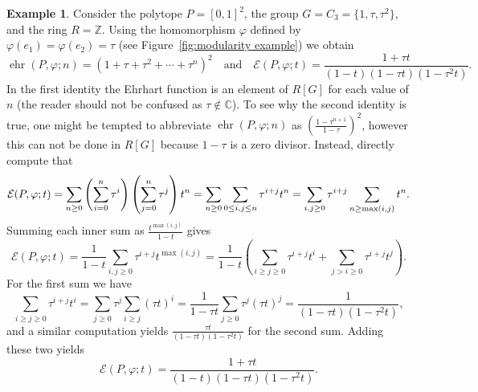 \documentclass[12pt,reqno]{amsart}
\theoremstyle{definition}
\newtheorem{exam}[thm]{Example}
\theoremstyle{remark}
\newcommand{\Z}{\mathbb{Z}}
\renewcommand{\phi}{\varphi}
\DeclareMathOperator{\ehr}{ehr}
\begin{document}
\begin{exam}\label{ex:first example}
Consider the polytope $P = [0,1]^2$, the group $G = C_3=\{1,\tau,\tau^2\}$, and the ring $R = \Z$. Using the homomorphism $\phi$ defined by $\phi(e_1)=\phi(e_2)=\tau$ (see Figure~\ref{fig:modularity example}) we obtain
\[
    \ehr(P,\varphi;n) =  (1+\tau+\tau^2+\cdots+\tau^n)^2 \quad 
    \text{and} \quad \mathcal{E}(P,\varphi;t) = \frac{1+\tau t}{(1-t)(1-\tau t)(1-\tau^2t)}.
\]
In the first identity the Ehrhart function is an element of $R[G]$ for each value of $n$ (the reader should not be confused as $\tau \notin {\mathbb C}$). To see why the second identity is true, one might be tempted to abbreviate $\ehr(P,\phi;n)$ as $\left(\frac{1-\tau^{n+1}}{1-\tau}\right)^2$, however this can not be done in $R[G]$ because $1-\tau$ is a zero divisor. Instead, directly compute that
\[
\mathcal{E}(P,\phi;t) = \sum_{n \geq 0} \left(\sum_{i=0}^n \tau^i\right) \left(\sum_{j=0}^n \tau^j\right) t^n = \sum_{n \geq 0} \sum_{0 \leq i,j \leq n} \tau^{i+j} t^n \\
= \sum_{i,j \geq 0} \tau^{i+j} \sum_{n \geq \max(i,j)} t^n.
\]
Summing each inner sum as $\frac{t^{\max(i,j)}}{1-t}$ gives
\[
\mathcal{E}(P,\phi;t) = \frac{1}{1-t} \sum_{i,j \geq 0} \tau^{i+j}t^{\max(i,j)} = \frac{1}{1-t} \left( \sum_{i \geq j \geq 0} \tau^{i+j}t^i + \sum_{j>i \geq 0} \tau^{i+j} t^j\right).
\]
For the first sum we have
\[
\sum_{i \geq j \geq 0} \tau^{i+j} t^i = \sum_{j \geq 0} \tau^j \sum_{i \geq j} (\tau t)^i = \frac{1}{1-\tau t} \sum_{j \geq 0} \tau^j (\tau t)^j = \frac{1}{(1-\tau t)(1-\tau^2 t)},
\]
and a similar computation yields $\frac{\tau t}{(1-\tau t)(1-\tau^2 t)}$ for the second sum.  Adding these two yields 
\[
\mathcal{E}(P,\phi;t) = \frac{1+\tau t}{(1-t)(1-\tau t)(1-\tau^2t)}.
\]

\begin{figure}
    \centering
{}
\end{figure}
\end{exam}
\end{document}
